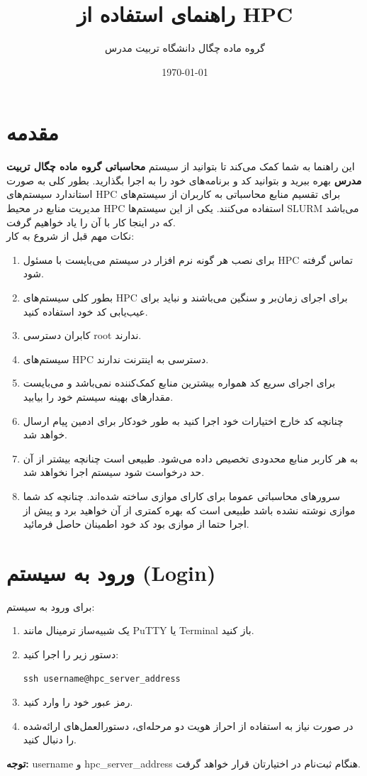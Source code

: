 \documentclass[a4paper,12pt]{article}
\title{راهنمای استفاده از HPC}
\author{گروه ماده چگال دانشگاه تربیت مدرس}
\date{\today}
\begin{document}
\maketitle

\section{مقدمه}

این راهنما به شما کمک می‌کند تا بتوانید از سیستم \textbf{محاسباتی گروه ماده چگال تربیت مدرس} بهره ببرید و بتوانید کد و برنامه‌های خود را به اجرا بگذارید. بطور کلی به صورت استاندارد سیستم‌های HPC برای تقسیم منابع محاسباتی به کاربران از سیستم‌های مدیریت منابع در محیط HPC استفاده می‌کنند. یکی از این سیستم‌ها SLURM می‌باشد که در اینجا کار با آن را یاد خواهیم گرفت.\\
نکات مهم قبل از شروع به کار:
\begin{enumerate}
	\item برای نصب هر گونه نرم افزار در سیستم می‌بایست با مسئول HPC تماس گرفته شود.
	\item بطور کلی سیستم‌های HPC برای اجرای زمان‌بر و سنگین می‌باشند و نباید برای عیب‌یابی کد خود استفاده کنید.
	\item کابران دسترسی root ندارند.
	\item سیستم‌های HPC دسترسی به اینترنت ندارند.
	\item برای اجرای سریع کد همواره بیشترین منابع کمک‌کننده نمی‌باشد و می‌بایست مقدارهای بهینه سیستم خود را بیابید.
	\item چنانچه کد خارج اختیارات خود اجرا کنید به طور خودکار برای ادمین پیام ارسال خواهد شد.
	\item
به هر کاربر منابع محدودی تخصیص داده می‌شود. طبیعی است چنانچه بیشتر از آن حد درخواست شود سیستم اجرا نخواهد شد.
\item سرورهای محاسباتی عموما برای کارای موازی ساخته شده‌اند. چنانچه کد شما موازی نوشته نشده باشد طبیعی است که بهره کمتری از آن خواهید برد و پیش از اجرا حتما از موازی بود کد خود اطمینان حاصل فرمائید.

\end{enumerate}

\section{ورود به سیستم (Login)}
برای ورود به سیستم:
\begin{enumerate}
    \item یک شبیه‌ساز ترمینال 
   مانند PuTTY یا Terminal باز کنید.
    \item دستور زیر را اجرا کنید:
\begin{latin}
    \begin{verbatim}
ssh username@hpc_server_address
    \end{verbatim}
\end{latin}
    \item رمز عبور خود را وارد کنید.
    \item در صورت نیاز به استفاده از احراز هویت دو مرحله‌ای، دستورالعمل‌های ارائه‌شده را دنبال کنید.
\end{enumerate}
\textbf{توجه:} username و hpc\_server\_address هنگام ثبت‌نام در اختیارتان قرار خواهد گرفت.
\end{document}
